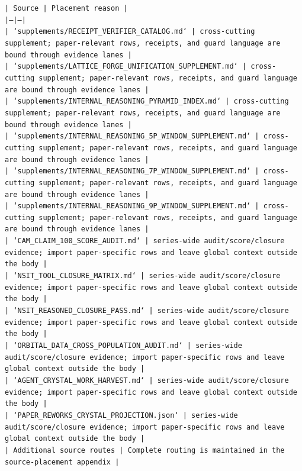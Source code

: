 \documentclass[11pt]{article}
\begin{document}
\noindent\texttt{| Source | Placement reason |}\\
\noindent\texttt{|---|---|}\\
\noindent\texttt{| `supplements/RECEIPT\_VERIFIER\_CATALOG.md` | cross-cutting supplement; paper-relevant rows, receipts, and guard language are bound through evidence lanes |}\\
\noindent\texttt{| `supplements/LATTICE\_FORGE\_UNIFICATION\_SUPPLEMENT.md` | cross-cutting supplement; paper-relevant rows, receipts, and guard language are bound through evidence lanes |}\\
\noindent\texttt{| `supplements/INTERNAL\_REASONING\_PYRAMID\_INDEX.md` | cross-cutting supplement; paper-relevant rows, receipts, and guard language are bound through evidence lanes |}\\
\noindent\texttt{| `supplements/INTERNAL\_REASONING\_5P\_WINDOW\_SUPPLEMENT.md` | cross-cutting supplement; paper-relevant rows, receipts, and guard language are bound through evidence lanes |}\\
\noindent\texttt{| `supplements/INTERNAL\_REASONING\_7P\_WINDOW\_SUPPLEMENT.md` | cross-cutting supplement; paper-relevant rows, receipts, and guard language are bound through evidence lanes |}\\
\noindent\texttt{| `supplements/INTERNAL\_REASONING\_9P\_WINDOW\_SUPPLEMENT.md` | cross-cutting supplement; paper-relevant rows, receipts, and guard language are bound through evidence lanes |}\\
\noindent\texttt{| `CAM\_CLAIM\_100\_SCORE\_AUDIT.md` | series-wide audit/score/closure evidence; import paper-specific rows and leave global context outside the body |}\\
\noindent\texttt{| `NSIT\_TOOL\_CLOSURE\_MATRIX.md` | series-wide audit/score/closure evidence; import paper-specific rows and leave global context outside the body |}\\
\noindent\texttt{| `NSIT\_REASONED\_CLOSURE\_PASS.md` | series-wide audit/score/closure evidence; import paper-specific rows and leave global context outside the body |}\\
\noindent\texttt{| `ORBITAL\_DATA\_CROSS\_POPULATION\_AUDIT.md` | series-wide audit/score/closure evidence; import paper-specific rows and leave global context outside the body |}\\
\noindent\texttt{| `AGENT\_CRYSTAL\_WORK\_HARVEST.md` | series-wide audit/score/closure evidence; import paper-specific rows and leave global context outside the body |}\\
\noindent\texttt{| `PAPER\_REWORKS\_CRYSTAL\_PROJECTION.json` | series-wide audit/score/closure evidence; import paper-specific rows and leave global context outside the body |}\\
\noindent\texttt{| Additional source routes | Complete routing is maintained in the source-placement appendix |}\\
\end{document}
